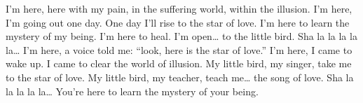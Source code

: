   \begin{translation}[EN]
    I'm here, here with my pain, in the suffering world, within the illusion.
    \nextverse
    I'm here, I'm going out one day. One day I'll rise to the star of love.
    \nextverse
    I'm here to learn the mystery of my being.
    I'm here to heal. I'm open\ldots{} to the little bird.
    \nextverse
    Sha la la la la la\ldots
    \nextverse
    I'm here, a voice told me: ``look, here is the star of love.''
    \nextverse
    I'm here, I came to wake up. I came to clear the world of illusion.
    \nextverse
    My little bird, my singer, take me to the star of love.
    My little bird, my teacher, teach me\ldots{} the song of love.
    \nextverse
    Sha la la la la la\ldots
    \nextverse
    You're here to learn the mystery of your being.
  \end{translation}
\]\]\]\]\]\]\]\]\]\]\]\]\]\]\]\]\]\]\]\]\]\]\]\]\]\]\]\]\]\]\]\]\]\]\]\]\]\]\]\]\]\]\]\]\]\]\]\]\]\]\]\]\]\]\]\]\]\]\]\]\]\]\]\]\]\]\]\]\]\]\]\]\]\]\]\]\]\]\]\]\]\]\]\]\]\]\]\]\]\]\]\]\]\]\]\]\]\]\]\]\]\]\]\]\]\]\]\]\]\]\]\]\]\]\]\]\]\]\]\]\]\]\]\]\]\]\]\]\]\]\]\]\]\]\]\]\]\]\]\]\]\]\]\]\]\]\]\]\]\]\]\]\]\]\]\]\]\]\]\]\]\]\]\]\]\]\]\]\]\]\]\]\]\]\]\]\]\]\]\]\]\]\]\]\]\]\]\]\]\]\]\]\]\]\]\]\]\]\]\]\]\]\]\]\]\]\]\]\]\]\]\]\]\]\]\]\]\]\]\]\]\]\]\]\]\]\]\]\]\]\]\]\]\]\]\]\]\]\]\]\]\]\]\]\]\]\]\]\]\]\]\]\]\]\]\]\]\]\]\]\]\]\]\]\]\]\]\]\]\]\]\]\]\]\]\]\]\]\]\]\]\]\]\]\]\]\]\]\]\]\]\]\]\]\]\]\]\]\]\]\]\]\]\]\]\]\]\]\]\]\]\]\]\]\]\]\]\]\]\]\]\]\]\]\]\]\]\]\]\]\]\]\]\]\]\]\]\]\]\]\]\]\]\]\]\]\]\]\]\]\]\]\]\]\]\]\]\]\]\]\]\]\]\]\]\]\]\]\]\]\]\]\]\]\]\]\]\]\]\]\]\]\]\]\]\]\]\]\]\]\]\]\]\]\]\]\]\]\]\]\]\]\]\]\]\]\]\]\]\]\]\]\]\]\]\]\]\]\]\]\]\]\]\]\]\]\]\]\]\]\]\]\]\]\]\]\]\]\]\]\]\]\]\]\]\]\]\]\]\]\]\]\]\]\]\]\]\]\]\]\]\]\]\]\]\]\]\]\]\]\]\]\]\]\]\]\]\]\]\]\]\]\]\]\]\]\]\]\]\]\]\]\]\]\]\]\]\]\]\]\]\]\]\]\]\]\]\]\]\]\]\]\]\]\]\]\]\]\]\]\]\]\]\]\]\]\]\]\]\]\]\]\]\]\]\]\]\]\]\]\]\]\]\]\]\]\]\]\]\]\]\]\]\]\]\]\]\]\]\]\]\]\]\]\]\]\]\]\]\]\]\]\]\]\]\]\]\]\]\]\]\]\]\]\]\]\]\]\]\]\]\]\]\]\]\]\]\]\]\]\]\]\]\]\]\]\]\]\]\]\]\]\]\]\]\]\]\]\]\]\]\]\]\]\]\]\]\]\]\]\]\]\]\]\]\]\]\]\]\]\]\]\]\]\]\]\]\]\]\]\]\]\]\]\]\]\]\]\]\]\]\]\]\]\]\]\]\]\]\]\]\]\]\]\]\]\]\]\]\]\]\]\]\]\]\]\]\]\]\]\]\]\]\]\]\]\]\]\]\]\]\]\]\]\]\]\]\]\]\]\]\]\]\]\]\]\]\]\]\]\]\]\]\]\]\]\]\]\]\]\]\]\]\]\]\]\]\]\]\]\]\]\]\]\]\]\]\]\]\]\]\]\]\]\]\]\]\]\]\]\]\]\]\]\]\]\]\]\]\]\]\]\]\]\]\]\]\]\]\]\]\]\]\]\]\]\]\]\]\]\]\]\]\]\]\]\]\]\]\]\]\]\]\]\]\]\]\]\]\]\]\]\]\]\]\]\]\]\]\]\]\]\]\]\]\]\]\]\]\]\]\]\]\]\]\]\]\]\]\]\]\]\]\]\]\]\]\]\]\]\]\]\]\]\]\]\]\]\]\]\]\]\]\]\]\]\]\]\]\]\]\]\]\]\]\]\]\]\]\]\]\]\]\]\]\]\]\]\]\]\]\]\]\]\]\]\]\]\]\]\]\]\]\]\]\]\]\]\]\]\]\]\]\]\]\]\]\]\]\]\]\]\]\]\]\]\]\]\]\]\]\]\]\]\]\]\]\]\]\]\]\]\]\]\]\]\]\]\]\]\]\]\]\]\]\]\]\]\]\]\]\]\]\]\]\]\]\]\]\]\]\]\]\]\]\]\]\]\]\]\]\]\]\]\]\]\]\]\]\]\]\]\]\]\]\]\]\]\]\]\]\]\]\]\]\]\]\]\]\]\]\]\]\]\]\]\]\]\]\]\]\]\]\]\]\]\]\]\]\]\]\]\]\]\]\]\]\]\]\]\]\]\]\]\]\]\]\]\]\]\]\]\]\]\]\]\]\]\]\]\]\]\]\]\]\]\]\]\]\]\]\]\]\]\]\]\]\]\]\]\]\]\]\]\]\]\]\]\]\]\]\]\]\]\]\]\]\]\]\]\]\]\]\]\]\]\]\]\]\]\]\]\]\]\]\]\]\]\]\]\]\]\]\]\]\]\]\]\]\]\]\]\]\]\]\]\]\]\]\]\]\]\]\]\]\]\]\]\]\]\]\]\]\]\]\]\]\]\]\]\]\]\]\]\]\]\]\]\]\]\]\]\]\]\]\]\]\]\]\]\]\]\]\]\]\]\]\]\]\]\]\]\]\]\]\]\]\]\]\]\]\]\]\]\]\]\]\]\]\]\]\]\]\]\]\]\]\]\]\]\]\]\]\]\]\]\]\]\]\]\]\]\]\]\]\]\]\]\]\]\]\]\]\]\]
